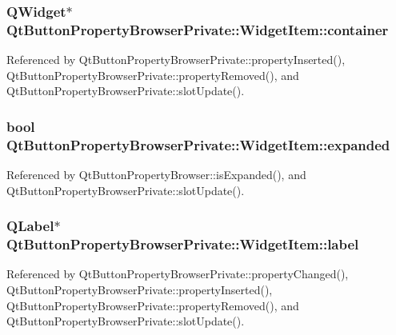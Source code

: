 \subsubsection[{container}]{\setlength{\rightskip}{0pt plus 5cm}Q\+Widget$\ast$ Qt\+Button\+Property\+Browser\+Private\+::\+Widget\+Item\+::container}\label{structQtButtonPropertyBrowserPrivate_1_1WidgetItem_a2b8694b7215ca66d832ef86fd183c735}


Referenced by Qt\+Button\+Property\+Browser\+Private\+::property\+Inserted(), Qt\+Button\+Property\+Browser\+Private\+::property\+Removed(), and Qt\+Button\+Property\+Browser\+Private\+::slot\+Update().

\subsubsection[{expanded}]{\setlength{\rightskip}{0pt plus 5cm}bool Qt\+Button\+Property\+Browser\+Private\+::\+Widget\+Item\+::expanded}\label{structQtButtonPropertyBrowserPrivate_1_1WidgetItem_a4117d0fd4c45cc41b06b3b3de300da4d}


Referenced by Qt\+Button\+Property\+Browser\+::is\+Expanded(), and Qt\+Button\+Property\+Browser\+Private\+::slot\+Update().

\subsubsection[{label}]{\setlength{\rightskip}{0pt plus 5cm}Q\+Label$\ast$ Qt\+Button\+Property\+Browser\+Private\+::\+Widget\+Item\+::label}\label{structQtButtonPropertyBrowserPrivate_1_1WidgetItem_af1a815d6358567f22aaa6ab01a8254a8}


Referenced by Qt\+Button\+Property\+Browser\+Private\+::property\+Changed(), Qt\+Button\+Property\+Browser\+Private\+::property\+Inserted(), Qt\+Button\+Property\+Browser\+Private\+::property\+Removed(), and Qt\+Button\+Property\+Browser\+Private\+::slot\+Update().

